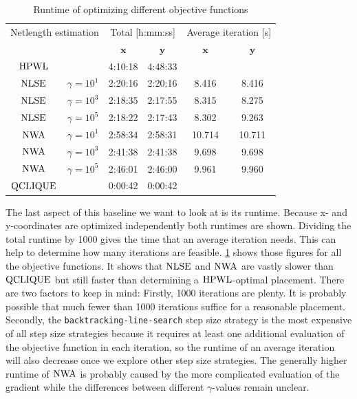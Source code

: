 \begin{table}[ht]
 \centering
 \begin{tabular}{c c c c c c}
  \multicolumn{2}{c}{Netlength estimation} & \multicolumn{2}{c}{Total [h:mm:ss]} & \multicolumn{2}{c}{Average iteration [\si{\second}]} \\
               &                           & \(\mathbf{x}\)   & \(\mathbf{y}\)   & \(\mathbf{x}\)   & \(\mathbf{y}\)  \\
  \hline
  \(\operatorname{HPWL}\)    &                           & 4:10:18          & 4:48:33          &                  &        \\
  \(\operatorname{NLSE}\)    & \(\gamma = 10^1\)         & 2:20:16          & 2:20:16          & 8.416            & 8.416  \\
  \(\operatorname{NLSE}\)    & \(\gamma = 10^3\)         & 2:18:35          & 2:17:55          & 8.315            & 8.275  \\
  \(\operatorname{NLSE}\)    & \(\gamma = 10^5\)         & 2:18:22          & 2:17:43          & 8.302            & 9.263  \\
  \(\operatorname{NWA}\)     & \(\gamma = 10^1\)         & 2:58:34          & 2:58:31          & 10.714           & 10.711 \\
  \(\operatorname{NWA}\)     & \(\gamma = 10^3\)         & 2:41:38          & 2:41:38          & 9.698            & 9.698  \\
  \(\operatorname{NWA}\)     & \(\gamma = 10^5\)         & 2:46:01          & 2:46:00          & 9.961            & 9.960  \\
  \(\operatorname{QCLIQUE}\) &                           & 0:00:42          & 0:00:42          &                  &        \\
 \end{tabular}
 \caption{Runtime of optimizing different objective functions}
 \label{table:baseline_runtime_by_objective_function}
\end{table}

The last aspect of this baseline we want to look at is its runtime.
Because x- and y-coordinates are optimized independently both runtimes are shown.
Dividing the total runtime by 1000 gives the time that an average iteration needs.
This can help to determine how many iterations are feasible.
\cref{table:baseline_runtime_by_objective_function} shows those figures for all
the objective functions.
It shows that \(\operatorname{NLSE}\) and \(\operatorname{NWA}\) are vastly slower than \(\operatorname{QCLIQUE}\)
but still faster than determining a \(\operatorname{HPWL}\)-optimal placement.
There are two factors to keep in mind:
Firstly, 1000 iterations are plenty.
It is probably possible that much fewer than 1000 iterations suffice for a reasonable placement.
Secondly, the \texttt{backtracking-line-search} step size strategy is the most expensive of all step size strategies
because it requires at least one additional evaluation of the objective function in each iteration,
so the runtime of an average iteration will also decrease once we explore other step size strategies.
The generally higher runtime of \(\operatorname{NWA}\) is probably caused by the more complicated evaluation of the gradient
while the differences between different \(\gamma\)-values remain unclear.


